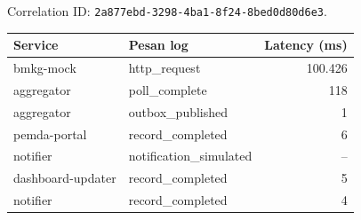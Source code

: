 Correlation ID: \nolinkurl{2a877ebd-3298-4ba1-8f24-8bed0d80d6e3}.\par\smallskip
\begin{tabularx}{\linewidth}{lYr}\toprule
Service & Pesan log & Latency (ms)\\\midrule
bmkg-mock & http\_request & 100.426\\
aggregator & poll\_complete & 118\\
aggregator & outbox\_published & 1\\
pemda-portal & record\_completed & 6\\
notifier & notification\_simulated & --\\
dashboard-updater & record\_completed & 5\\
notifier & record\_completed & 4\\
\bottomrule\end{tabularx}
